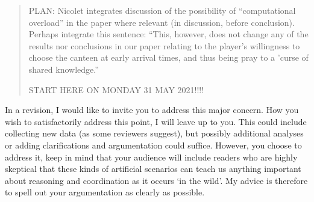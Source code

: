 \documentclass[a4paper]{article}
\newenvironment{response}{\smallskip \noindent \color{blue}}{\color{black}\smallskip}
\begin{document}
\begin{quote}
\begin{response}
   PLAN: Nicolet integrates discussion of the possibility of ``computational overload'' in the paper where relevant (in discussion, before conclusion). Perhaps integrate this sentence: ``This, however, does not change any of the results nor conclusions in our paper relating to the player's willingness to choose the canteen at early arrival times, and thus being pray to a 'curse of shared knowledge.''
 \end{response}
 
 START HERE ON MONDAY 31 MAY 2021!!!!
 
\end{quote}
In a revision, I would like to invite you to address this major concern. How you wish to satisfactorily address this point, I will leave up to you. This could include collecting new data (as some reviewers suggest), but possibly additional analyses or adding clarifications and argumentation could suffice. However, you choose to address it, keep in mind that your audience will include readers who are highly skeptical that these kinds of artificial scenarios can teach us anything important about reasoning and coordination as it occurs ‘in the wild’. My advice is therefore to spell out your argumentation as clearly as possible.  
\end{document}
